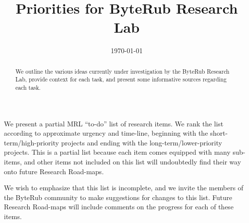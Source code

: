\documentclass[12pt,english]{mrl}
\theoremstyle{definition}
\numberwithin{equation}{section}
\numberwithin{figure}{section}
\numberwithin{equation}{section}
\numberwithin{equation}{section}
\numberwithin{figure}{section}
\begin{document}
\begin{frontmatter}

\begin{fmbox}
\hfill\setlength{\fboxrule}{0px}\setlength{\fboxsep}{5px}
\title{Priorities for ByteRub Research Lab}
\date{\today}
\author[
   addressref={mrl},
   email={bggoode@g.clemson.edu}
]{ }


\address[id=mrl]{
}
\end{fmbox}

\begin{abstractbox}
\begin{abstract}
We outline the various ideas currently under investigation by the ByteRub Research Lab, provide context for each task, and present some informative sources regarding each task. \end{abstract}
\end{abstractbox}
\end{frontmatter}

We present a partial  MRL ``to-do'' list of research items. We rank the list according to approximate urgency and time-line, beginning with the short-term/high-priority projects and ending with the long-term/lower-priority projects. This is a partial list because each item comes equipped with many sub-items, and other items not included on this list will undoubtedly find their way onto future Research Road-maps.  

We wish to emphasize that this list is incomplete, and we invite the members of the ByteRub community to make suggestions for changes to this list. Future Research Road-maps will include comments on the progress for each of these items. 


\vspace{0.1in}
\end{document}
